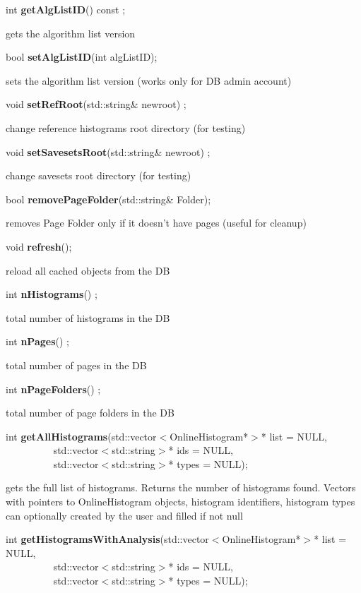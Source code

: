 \item    int {\bf getAlgListID}() const ;

 gets the algorithm list version


\item    bool {\bf setAlgListID}(int algListID);


 sets the algorithm list version (works only for DB admin account)


\item    void {\bf setRefRoot}(std::string\& newroot) ;

 change reference histograms root directory (for testing)


\item    void {\bf setSavesetsRoot}(std::string\& newroot) ;

 change savesets root directory (for testing)


\item    bool {\bf removePageFolder}(std::string\& Folder);


 removes Page Folder only if it doesn't have pages (useful for cleanup)


\item    void {\bf refresh}();


 reload all cached objects from the DB


\item    int {\bf nHistograms}() ;

 total number of histograms in the DB


\item    int {\bf nPages}() ;

 total number of pages in the DB


\item    int {\bf nPageFolders}() ;

  total number of page folders in the DB


\item    int {\bf getAllHistograms}(std::vector$<$OnlineHistogram*$>$* list = NULL,\\\mbox{}~~~~~~~~~
		       std::vector$<$std::string$>$* ids = NULL,\\\mbox{}~~~~~~~~~
		       std::vector$<$std::string$>$* types = NULL);

 gets the full list of histograms. Returns the number of histograms found. Vectors with pointers
 to OnlineHistogram objects, histogram identifiers, histogram types can optionally created  by the user
 and filled if not null


\item    int {\bf getHistogramsWithAnalysis}(std::vector$<$OnlineHistogram*$>$* list = NULL,\\\mbox{}~~~~~~~~~
				std::vector$<$std::string$>$* ids = NULL,\\\mbox{}~~~~~~~~~
				std::vector$<$std::string$>$* types = NULL);

